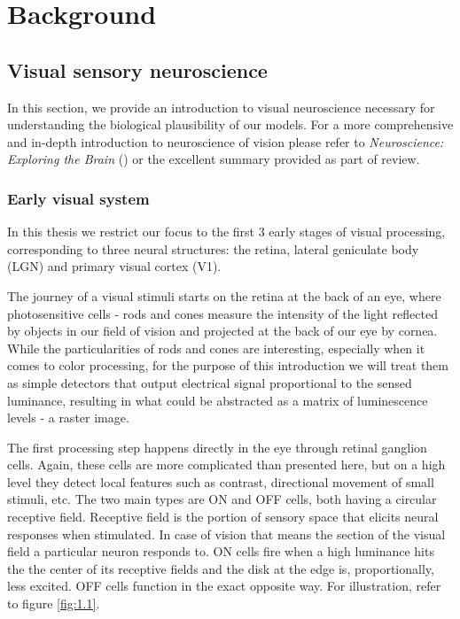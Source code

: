 \chapter{Background}\label{ch:1}

\section{Visual sensory neuroscience}
In this section, we provide an introduction to visual neuroscience necessary for understanding the biological plausibility of our models. For a more comprehensive and in-depth introduction to neuroscience of vision please refer to \textit{Neuroscience: Exploring the Brain} (\citep{bear_neuroscience:_2007}) or the excellent summary provided as part of \cite{Carandini10577} review.

\subsection{Early visual system}\label{ch:1.1.1}
In this thesis we restrict our focus to the first 3 early stages of visual processing, corresponding to three neural structures: the retina, lateral geniculate body (LGN) and primary visual cortex (V1).

The journey of a visual stimuli starts on the retina at the back of an eye, where photosensitive cells - rods and cones measure the intensity of the light reflected by objects in our field of vision and projected at the back of our eye by cornea. While the particularities of rods and cones are interesting, especially when it comes to color processing, for the purpose of this introduction we will treat them as simple detectors that output electrical signal proportional to the sensed luminance, resulting in what could be abstracted as a matrix of luminescence levels - a raster image. 

The first processing step happens directly in the eye through retinal ganglion cells. Again, these cells are more complicated than presented here, but on a high level they detect local features such as contrast, directional movement of small stimuli, etc. The two main types are ON and OFF cells, both having a circular receptive field. Receptive field is the portion of sensory space that elicits neural responses when stimulated. In case of vision that means the section of the visual field a particular neuron responds to. ON cells fire when a high luminance hits the the center of its receptive fields and the disk at the edge is, proportionally, less excited. OFF cells function in the exact opposite way. For illustration, refer to figure \ref{fig:1.1}.

